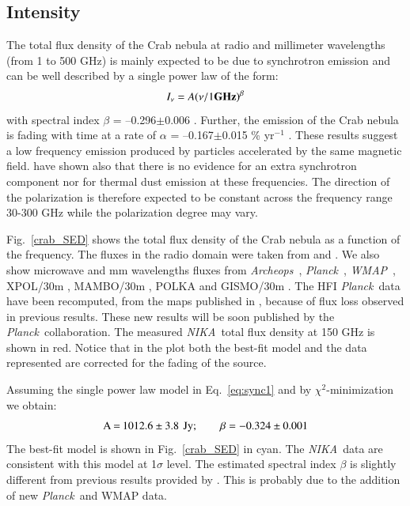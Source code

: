\documentclass[twocolumn,traditabstract]{aa}
\def\NIKA{\textit{NIKA}}
\def\Archeops{\textit{Archeops}}
\def\Planck{\textit{Planck}}
\def\WMAP{\textit{WMAP}}
\begin{document}
\subsection{Intensity}
The total flux density of the Crab nebula at radio and millimeter
wavelengths (from 1 to 500 GHz) is mainly expected to be due to synchrotron emission and can be
well described by a single power law of the form:
\begin{equation}
I_{\nu} = A(\nu / 1 {\bf GHz})^{\beta}
\label{eq:sync1}
\end{equation}
with spectral index $\beta$ = --0.296$\pm$0.006 \citep{baars1977absolute,macias2010}. Further, the emission of the Crab nebula is fading with time at a rate of $\alpha$ = --0.167$\pm$0.015 \% yr$^{-1}$ \citep{aller1985decrease}. 
These results suggest a low frequency emission produced by particles accelerated by the same magnetic field. \cite{macias2010} have shown also that there is no evidence for an extra synchrotron component nor for thermal dust emission at these frequencies. The direction of the polarization is therefore expected to be constant across the frequency range 30-300 GHz while the polarization degree may vary.

Fig.~\ref{crab_SED} shows the total flux density of the Crab nebula as a function of the frequency. The fluxes in the radio domain were taken from \cite{dmitrenko1970absolute} and \cite{1971IzVUZ..14..157V}. We also show microwave and mm wavelengths fluxes from \Archeops\ \citep{macias2007archeops}, \Planck\ \citep{2015arXiv150702058P}, \WMAP\ \citep{2011ApJS..192...19W}, XPOL/30m \citep{aumont2010}, MAMBO/30m \citep{2002A&A...386.1044B}, POLKA \citep{2014PASP..126.1027W} and GISMO/30m \citep{2011ApJ...734...54A}. The HFI \Planck\ data have been recomputed, from the maps published in \cite{refId0}, because of flux loss observed in previous results. These new results will be soon published by the \Planck\ collaboration. The measured \NIKA\ total flux density at 150 GHz is shown in red. 
Notice that in the plot both the best-fit model and the data represented are corrected for the fading of the source.

Assuming the single power law model in Eq.~\ref{eq:sync1} and
by $\chi^2$-minimization we obtain:
$$\setlength\arraycolsep{0.1em}
 \begin{array}{rclcl}
  \textrm{A}&=& 1012.6\pm3.8 & & \textrm{Jy}; \quad \quad  \textrm{$\beta$} = - 0.324\pm0.001\\
 \end{array}
$$
The best-fit model is shown in Fig.~\ref{crab_SED} in cyan.
The \NIKA\ data are consistent with this model at 1$\sigma$ level.
The estimated spectral index $\beta$ is slightly different from previous results provided by \cite{macias2010}. This 
is probably due to the addition of new \Planck\ and  WMAP data.
\end{document}
